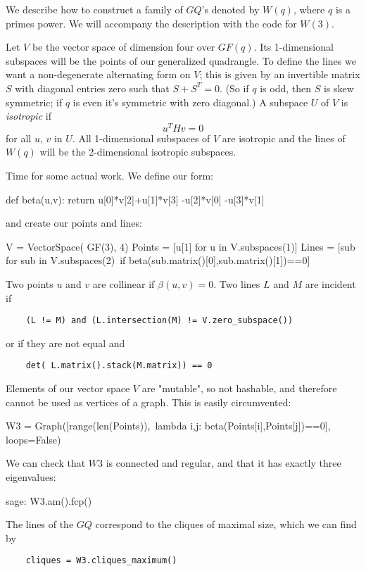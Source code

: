 We describe how to construct a family of $GQ$'s denoted by $W(q)$, where
$q$ is a primes power. We will accompany the description with the
code for $W(3)$.

Let $V$ be the vector space of dimension four over $GF(q)$. Its 1-dimensional
subspaces will be the points of our generalized quadrangle. To define
the lines we want a non-degenerate alternating form on $V$; this is
given by an invertible matrix $S$ with diagonal entries zero such that $S+S^T=0$.
(So if $q$ is odd, then $S$ is skew symmetric; if $q$ is even it's symmetric
with zero diagonal.) A subspace $U$ of $V$ is \textsl{isotropic}
if
\[
    u^THv = 0
\]
for all $u$, $v$ in $U$. All 1-dimensional subspaces of $V$ are isotropic and the
lines of $W(q)$ will be the 2-dimensional isotropic subspaces.

Time for some actual work. We define our form:
\begin{sageblock}
def beta(u,v):
    return u[0]*v[2]+u[1]*v[3] -u[2]*v[0] -u[3]*v[1]
\end{sageblock}
and create our points and lines:
\begin{sageblock}
    V = VectorSpace( GF(3), 4)
    Points = [u[1] for u in V.subspaces(1)]
    Lines = [sub for sub in V.subspaces(2)\
      if beta(sub.matrix()[0],sub.matrix()[1])==0]
\end{sageblock}

Two points $u$ and $v$ are collinear if $\beta(u,v)=0$. Two lines $L$ and $M$ 
are incident if
\begin{verbatim}
    (L != M) and (L.intersection(M) != V.zero_subspace())
\end{verbatim}
or if they are not equal and
\begin{verbatim}
    det( L.matrix().stack(M.matrix)) == 0
\end{verbatim}

Elements of our vector space $V$ are "mutable", so not hashable, 
and therefore cannot be used as vertices of a graph. This is easily circumvented:
\begin{sageblock}
W3 = Graph([range(len(Points)),\
   lambda i,j: beta(Points[i],Points[j])==0], loops=False)
\end{sageblock}
We can check that $W3$ is connected and regular, and that it has exactly three
eigenvalues:
\begin{sageexample}
    sage: W3.am().fcp()
\end{sageexample}
The lines of the $GQ$ correspond to the cliques of maximal size, which we
can find by
\begin{verbatim}
    cliques = W3.cliques_maximum()
\end{verbatim}

